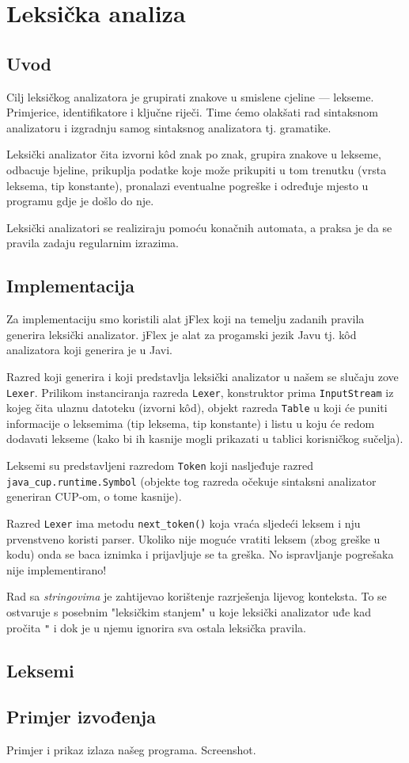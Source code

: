 \chapter{Leksička analiza}

\section{Uvod}
Cilj leksičkog analizatora je grupirati znakove u smislene cjeline --- lekseme. Primjerice, identifikatore i ključne riječi.
Time ćemo olakšati rad sintaksnom analizatoru i izgradnju samog sintaksnog analizatora tj. gramatike.

Leksički analizator čita izvorni kôd znak po znak, grupira znakove u lekseme, odbacuje bjeline, prikuplja podatke koje može prikupiti u tom trenutku (vrsta leksema, tip konstante), pronalazi eventualne pogreške i određuje mjesto u programu gdje je došlo do nje.

Leksički analizatori se realiziraju pomoću konačnih automata, a praksa je da se pravila zadaju regularnim izrazima.

\section{Implementacija}

Za implementaciju smo koristili alat jFlex koji na temelju zadanih pravila generira leksički analizator. jFlex je
alat za progamski jezik Javu tj. kôd analizatora koji generira je u Javi.

Razred koji generira i koji predstavlja leksički analizator u našem se slučaju zove \texttt{Lexer}. Prilikom
instanciranja razreda \texttt{Lexer}, konstruktor prima \texttt{InputStream} iz kojeg čita ulaznu datoteku (izvorni kôd),
objekt razreda \texttt{Table} u koji će puniti informacije o leksemima (tip leksema, tip konstante) i listu u koju će
redom dodavati lekseme (kako bi ih kasnije mogli prikazati u tablici korisničkog sučelja).

Leksemi su predstavljeni razredom \texttt{Token} koji nasljeđuje razred \texttt{java\_cup.runtime.Symbol} (objekte tog razreda
očekuje sintaksni analizator generiran CUP-om, o tome kasnije). 

Razred \texttt{Lexer} ima metodu \texttt{next\_token()} koja vraća sljedeći leksem i nju prvenstveno koristi parser. Ukoliko
nije moguće vratiti leksem (zbog greške u kodu) onda se baca iznimka i prijavljuje se ta greška. 
No ispravljanje pogrešaka nije implementirano!

Rad sa \emph{stringovima} je zahtijevao korištenje razrješenja lijevog konteksta. To se ostvaruje s posebnim "leksičkim stanjem" u
koje leksički analizator uđe kad pročita \texttt{"} i dok je u njemu ignorira sva ostala leksička pravila. 

\section{Leksemi}

\section{Primjer izvođenja}

Primjer i prikaz izlaza našeg programa. Screenshot.
